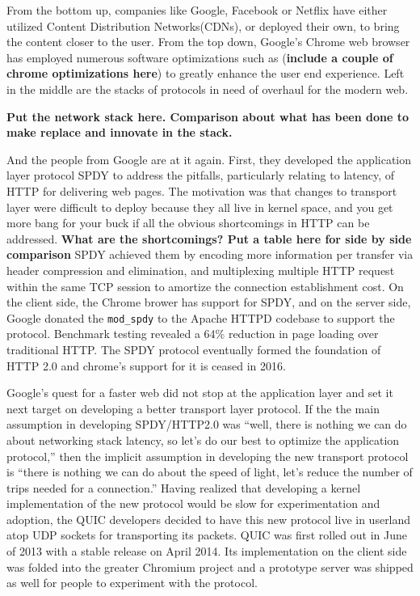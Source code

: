 \documentclass{sig-alternate-05-2015}
\begin{document}
From the bottom up, companies like Google, Facebook or Netflix have either utilized Content Distribution Networks(CDNs), or deployed their own, to bring the content closer to the user. From the top down, Google's Chrome web browser has employed numerous software optimizations such as (\textbf{include a couple of chrome optimizations here}) to greatly enhance the user end experience. Left in the middle are the stacks of protocols in need of overhaul for the modern web.

\textbf{Put the network stack here. Comparison about what has been done to make replace and innovate in the stack.}

And the people from Google are at it again. First, they developed the application layer protocol SPDY to address the pitfalls, particularly relating to latency, of HTTP for delivering web pages. The motivation was that changes to transport layer were difficult to deploy because they all live in kernel space, and you get more bang for your buck if all the obvious shortcomings in HTTP can be addressed. \textbf{What are the shortcomings? Put a table here for side by side comparison} SPDY achieved them by encoding more information per transfer via header compression and elimination, and multiplexing multiple HTTP request within the same TCP session to amortize the connection establishment cost. On the client side, the Chrome brower has support for SPDY, and on the server side, Google donated the \texttt{mod\_spdy} to the Apache HTTPD codebase to support the protocol. Benchmark testing revealed a 64\% reduction in page loading over traditional HTTP. The SPDY protocol eventually formed the foundation of HTTP 2.0 and chrome's support for it is ceased in 2016. 

Google's quest for a faster web did not stop at the application layer and set it next target on developing a better transport layer protocol. If the the main assumption in developing SPDY/HTTP2.0 was ``well, there is nothing we can do about networking stack latency, so let's do our best to optimize the application protocol,'' then the implicit assumption in developing the new transport protocol is ``there is nothing we can do about the speed of light, let's reduce the number of trips needed for a connection.'' Having realized that developing a kernel implementation of the new protocol would be slow for experimentation and adoption, the QUIC developers decided to have this new protocol live in userland atop UDP sockets for transporting its packets. QUIC was first rolled out in June of 2013 with a stable release on April 2014. Its implementation on the client side was folded into the greater Chromium project and a prototype server was shipped as well for people to experiment with the protocol.
\end{document}

